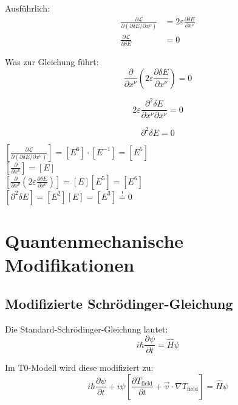 \documentclass[12pt,a4paper]{article}
\newcommand{\tfield}{T_{\text{field}}}
\newcommand{\dfield}{\delta E}
\theoremstyle{definition}
\begin{document}
	Ausführlich:
	\begin{align}
		\frac{\partial \mathcal{L}}{\partial(\partial \dfield/\partial x^\nu)} &= 2\varepsilon \frac{\partial \dfield}{\partial x^\nu} \\
		\frac{\partial \mathcal{L}}{\partial \dfield} &= 0
	\end{align}
	
	Was zur Gleichung führt:
	\begin{equation}
		\frac{\partial}{\partial x^\nu}\left(2\varepsilon \frac{\partial \dfield}{\partial x^\nu}\right) = 0
	\end{equation}
	
	\begin{equation}
		2\varepsilon \frac{\partial^2 \dfield}{\partial x^\nu \partial x^\nu} = 0
	\end{equation}
	
	\begin{equation}
		\boxed{\partial^2 \dfield = 0}
	\end{equation}
	
	\begin{einheitencheck}
		$[\frac{\partial \mathcal{L}}{\partial(\partial \dfield/\partial x^\nu)}] = [E^6] \cdot [E^{-1}] = [E^5]$\\
		$[\frac{\partial}{\partial x^\nu}] = [E]$\\
		$[\frac{\partial}{\partial x^\nu}\left(2\varepsilon \frac{\partial \dfield}{\partial x^\nu}\right)] = [E][E^5] = [E^6]$\\
		$[\partial^2 \dfield] = [E^2][E] = [E^3] \stackrel{!}{=} 0$ \checkmark
	\end{einheitencheck}
	
	\section{Quantenmechanische Modifikationen}
	
	\subsection{Modifizierte Schrödinger-Gleichung}
	
	Die Standard-Schrödinger-Gleichung lautet:
	\begin{equation}
		i \hbar \frac{\partial\psi}{\partial t} = \hat{H}\psi
	\end{equation}
	
	Im T0-Modell wird diese modifiziert zu:
	\begin{equation}
		\boxed{i \hbar \frac{\partial\psi}{\partial t} + i\psi\left[\frac{\partial \tfield}{\partial t} + \vec{v} \cdot \nabla \tfield\right] = \hat{H}\psi}
	\end{equation}
	
\end{document}
